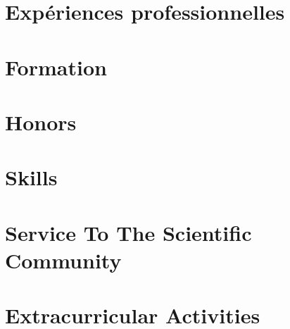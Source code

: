 \documentclass{prometheus_cv}
\begin{document}
\thispagestyle{empty}					%
\pagestyle{fancy}			 		%

\vspace*{-1cm}
\centering 

\cite{kervegan_marque_2023}\textsc{}

\vspace*{0.4cm}
\section{Expériences professionnelles}


\vspace*{0.4cm}
\section{Formation}


\printbibliography[title={Publications}, keyword={publications}]
\printbibliography[title={Communications}, keyword={communications}]

\section{Honors}
%

\section{Skills}
%


\section{Service To The Scientific Community}
%


\section{Extracurricular Activities}
%
\end{document}
